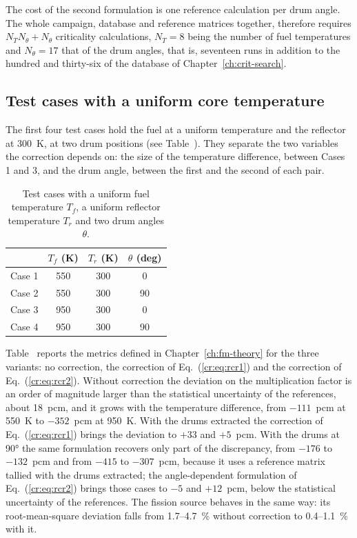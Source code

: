 The cost of the second formulation is one reference calculation per drum
angle. The whole campaign, database and reference matrices together,
therefore requires $N_T N_\theta + N_\theta$ criticality calculations,
$N_T=8$ being the number of fuel temperatures and $N_\theta=17$ that of the drum
angles, that is, seventeen runs in addition to the hundred and thirty-six of the database of
Chapter~\ref{ch:crit-search}.

\subsection{Test cases with a uniform core temperature}\label{cr:sec:rcr-tests}

The first four test cases hold the fuel at a uniform temperature and the
reflector at \SI{300}{K}, at two drum positions (see Table~).
They separate the two variables the correction depends on: the size of the
temperature difference, between Cases 1 and 3, and the drum angle, between the
first and the second of each pair.

\begin{table}[htbp]
  \centering
  \caption[Test cases with a uniform core temperature]{Test cases with a
  uniform fuel temperature $T_f$, a uniform reflector temperature $T_r$ and two
  drum angles $\theta$.}
  \label{cr:tab:cases14}
  \begin{tabular}{lccc}
    \toprule
    & $T_f$ (K) & $T_r$ (K) & $\theta$ (deg) \\
    \midrule
    Case 1 & 550 & 300 &  0 \\
    Case 2 & 550 & 300 & 90 \\
    Case 3 & 950 & 300 &  0 \\
    Case 4 & 950 & 300 & 90 \\
    \bottomrule
  \end{tabular}
\end{table}

Table~ reports the metrics defined in Chapter~\ref{ch:fm-theory} for
the three variants: no correction, the correction of Eq.~(\ref{cr:eq:rcr1}) and
the correction of Eq.~(\ref{cr:eq:rcr2}). Without correction the deviation on
the multiplication factor is an order of magnitude larger than the statistical
uncertainty of the references, about \SI{18}{pcm}, and it grows with the
temperature difference, from $-111$~pcm at \SI{550}{K} to $-352$~pcm at
\SI{950}{K}. With the drums extracted the correction of Eq.~(\ref{cr:eq:rcr1})
brings the deviation to $+33$ and $+5$~pcm. With the drums at \ang{90} the same
formulation recovers only part of the discrepancy, from $-176$ to $-132$~pcm and
from $-415$ to $-307$~pcm, because it uses a reference matrix tallied with the
drums extracted; the angle-dependent formulation of Eq.~(\ref{cr:eq:rcr2})
brings those cases to $-5$ and $+12$~pcm, below the statistical uncertainty of
the references. The fission source behaves in the same way: its root-mean-square deviation
falls from 1.7--4.7~\% without correction to 0.4--1.1~\% with it.

